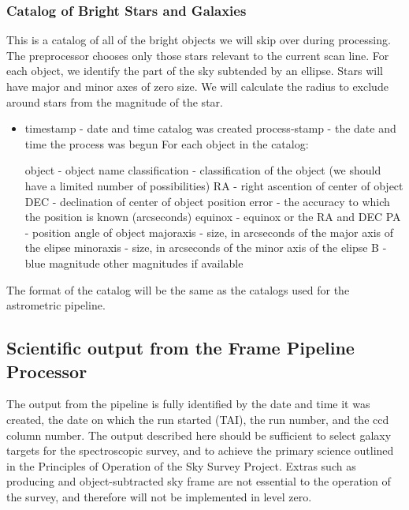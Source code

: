 \subsubsection{Catalog of Bright Stars and Galaxies}

	This is a catalog of all of the bright objects we will skip over
during processing.  The preprocessor chooses only those stars relevant to the 
current scan line.  For each object, we identify the part of the sky subtended
by an ellipse.  Stars will have major and minor axes of zero size.  We will
calculate the radius to exclude around stars from the magnitude of the star.
\begin{itemize} 
\item timestamp - date and time catalog was created
\sitem process-stamp - the date and time the process was begun
\sitem For each object in the catalog:
\begin{itemize}
\mitem object - object name
\mitem classification - classification of the object (we should have a limited number of possibilities)
\mitem RA - right ascention of center of object
\mitem DEC - declination of center of object
\mitem position error - the accuracy to which the position is known (arcseconds)
\mitem equinox - equinox or the RA and DEC
\mitem PA - position angle of object
\mitem majoraxis - size, in arcseconds of the major axis of the elipse
\mitem minoraxis - size, in arcseconds of the minor axis of the elipse
\mitem B - blue magnitude
\mitem other magnitudes if available
\end{itemize}
\end{itemize}
The format of the catalog will be the same as the catalogs used for the
astrometric pipeline.

\subsection{Scientific output from the Frame Pipeline Processor}

	The output from the pipeline is fully identified by the date and
time it was created, the date on which the run started (TAI), the run
number, and the ccd column number.  The output described here should be
sufficient to select galaxy targets for the spectroscopic survey, and to
achieve the primary science outlined in the Principles of Operation of
the Sky Survey Project.  Extras such as producing and object-subtracted
sky frame are not essential to the operation of the survey, and therefore
will not be implemented in level zero.

